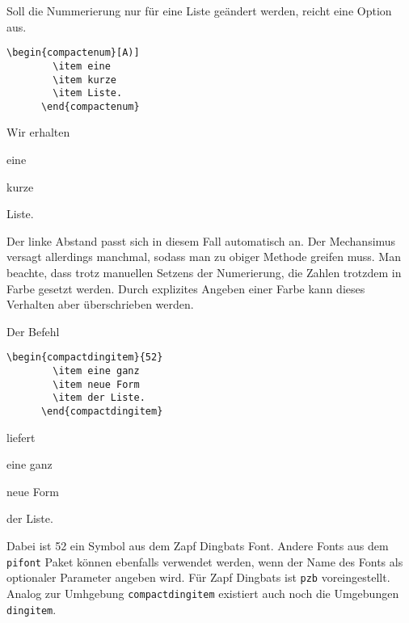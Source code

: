 \documentclass{exercise}
\begin{document}
    Soll die Nummerierung nur für eine Liste geändert werden, reicht eine Option aus.
    \begin{lstlisting}[gobble=6]
      \begin{compactenum}[A)]
        \item eine
        \item kurze
        \item Liste.
      \end{compactenum}
    \end{lstlisting}
    Wir erhalten
    \begin{compactenum}[A)]
      \item eine
      \item kurze
      \item Liste.
    \end{compactenum}
    Der linke Abstand passt sich in diesem Fall automatisch an. Der Mechansimus
    versagt allerdings manchmal, sodass man zu obiger Methode greifen muss.
    Man beachte, dass trotz manuellen Setzens
    der Numerierung, die Zahlen trotzdem in Farbe gesetzt werden. Durch explizites
    Angeben einer Farbe kann dieses Verhalten aber überschrieben werden.

    Der Befehl
    \begin{lstlisting}[gobble=6]
      \begin{compactdingitem}{52}
        \item eine ganz
        \item neue Form
        \item der Liste.
      \end{compactdingitem}
    \end{lstlisting}
    liefert
    \begin{compactdingitem}{52}
      \item eine ganz
      \item neue Form
      \item der Liste.
    \end{compactdingitem}
    Dabei ist 52 ein Symbol aus dem Zapf Dingbats Font. Andere Fonts
    aus dem \texttt{pifont} Paket können ebenfalls verwendet werden,
    wenn der Name des Fonts als optionaler Parameter angeben wird.
    Für Zapf Dingbats ist \texttt{pzb} voreingestellt.
    Analog zur Umhgebung \lstinline-compactdingitem- existiert auch noch die
    Umgebungen \lstinline-dingitem-.
\end{document}
